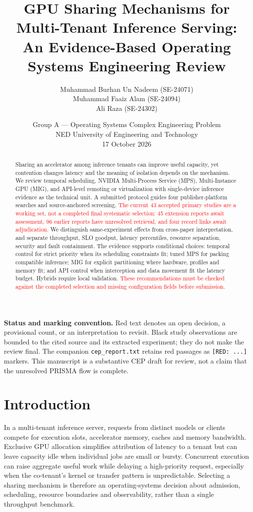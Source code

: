 \documentclass[12pt,a4paper]{article}
\title{GPU Sharing Mechanisms for Multi-Tenant Inference Serving:\\An Evidence-Based Operating Systems Engineering Review}
\author{Muhammad Burhan Un Nadeem (SE-24071)\\Muhammad Faaiz Alam (SE-24094)\\Ali Raza (SE-24302)}
\date{Group A --- Operating Systems Complex Engineering Problem\\NED University of Engineering and Technology\\17 October 2026}
\newcommand{\red}[1]{\textcolor{red}{#1}}
\begin{document}
\maketitle
\begin{abstract}
Sharing an accelerator among inference tenants can improve useful capacity, yet contention changes latency and the meaning of isolation depends on the mechanism. We review temporal scheduling, NVIDIA Multi-Process Service (MPS), Multi-Instance GPU (MIG), and API-level remoting or virtualization with single-device inference evidence as the technical unit. A submitted protocol guides four publisher-platform searches and source-anchored screening. \red{The current 43 accepted primary studies are a working set, not a completed final systematic selection: 45 extension reports await assessment, 96 earlier reports have unresolved retrieval, and four record links await adjudication.} We distinguish same-experiment effects from cross-paper interpretation, and separate throughput, SLO goodput, latency percentiles, resource separation, security and fault containment. The evidence supports conditional choices: temporal control for strict priority when its scheduling constraints fit; tuned MPS for packing compatible inference; MIG for explicit partitioning where hardware, profiles and memory fit; and API control when interception and data movement fit the latency budget. Hybrids require local validation. \red{These recommendations must be checked against the completed selection and missing configuration fields before submission.}
\end{abstract}
\noindent\textbf{Status and marking convention.} Red text denotes an open decision, a provisional count, or an interpretation to revisit. Black study observations are bounded to the cited source and its extracted experiment; they do not make the review final. The companion \texttt{cep\_report.txt} retains red passages as \texttt{[RED: ...]} markers. This manuscript is a substantive CEP draft for review, not a claim that the unresolved PRISMA flow is complete.
\newpage\tableofcontents\newpage

\section{Introduction}
In a multi-tenant inference server, requests from distinct models or clients compete for execution slots, accelerator memory, caches and memory bandwidth. Exclusive GPU allocation simplifies attribution of latency to a tenant but can leave capacity idle when individual jobs are small or bursty. Concurrent execution can raise aggregate useful work while delaying a high-priority request, especially when the co-tenant's kernel or transfer pattern is unpredictable. Selecting a sharing mechanism is therefore an operating-systems decision about admission, scheduling, resource boundaries and observability, rather than a single throughput benchmark.
\end{document}
